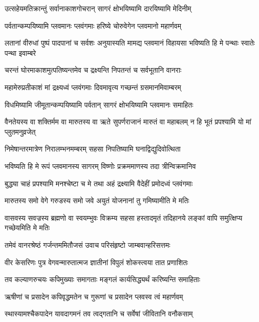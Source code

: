 \twolineshloka
{उत्सहेयमतिक्रान्तुं सर्वानाकाशगोचरान्}
{सागरं क्षोभयिष्यामि दारयिष्यामि मेदिनीम्} %

\twolineshloka
{पर्वतान्कम्पयिष्यामि प्लवमानः प्लवंगमाः}
{हरिष्ये चोरुवेगेन प्लवमानो महार्णवम्} %

\threelineshloka
{लतानां वीरुधां पुष्पं पादपानां च सर्वशः}
{अनुयास्यति मामद्य प्लवमानं विहायसा}
{भविष्यति हि मे पन्थाः स्वातेः पन्था इवाम्बरे} %

\twolineshloka
{चरन्तं घोरमाकाशमुत्पतिष्यन्तमेव च}
{द्रक्ष्यन्ति निपतन्तं च सर्वभूतानि वानराः} %

\twolineshloka
{महामेरुप्रतीकाशं मां द्रक्ष्यध्वं प्लवंगमाः}
{दिवमावृत्य गच्छन्तं ग्रसमानमिवाम्बरम्} %

\twolineshloka
{विधमिष्यामि जीमूतान्कम्पयिष्यामि पर्वतान्}
{सागरं क्षोभयिष्यामि प्लवमानः समाहितः} %

\threelineshloka
{वैनतेयस्य वा शक्तिर्मम वा मारुतस्य वा}
{ऋते सुपर्णराजानं मारुतं वा महाबलम्}
{न हि भूतं प्रपश्यामि यो मां प्लुतमनुव्रजेत्} %

\twolineshloka
{निमेषान्तरमात्रेण निरालम्भनमम्बरम्}
{सहसा निपतिष्यामि घनाद्विद्युदिवोत्थिता} %

\twolineshloka
{भविष्यति हि मे रूपं प्लवमानस्य सागरम्}
{विष्णोः प्रक्रममाणस्य तदा त्रीन्विक्रमानिव} %

\twolineshloka
{बुद्ध्या चाहं प्रपश्यामि मनश्चेष्टा च मे तथा}
{अहं द्रक्ष्यामि वैदेहीं प्रमोदध्वं प्लवंगमाः} %

\twolineshloka
{मारुतस्य समो वेगे गरुडस्य समो जवे}
{अयुतं योजनानां तु गमिष्यामीति मे मतिः} %

\threelineshloka
{वासवस्य सवज्रस्य ब्रह्मणो वा स्वयम्भुवः}
{विक्रम्य सहसा हस्तादमृतं तदिहानये}
{लङ्कां वापि समुत्क्षिप्य गच्छेयमिति मे मतिः} %

\twolineshloka
{तमेवं वानरश्रेष्ठं गर्जन्तममितौजसं}
{उवाच परिसंहृष्टो जाम्बवान्हरिसत्तमः} %

\twolineshloka
{वीर केसरिणः पुत्र वेगवन्मारुतात्मज}
{ज्ञातीनां विपुलं शोकस्त्वया तात प्रणाशितः} %

\twolineshloka
{तव कल्याणरुचयः कपिमुख्याः समागताः}
{मङ्गलं कार्यसिद्ध्यर्थं करिष्यन्ति समाहिताः} %

\twolineshloka
{ऋषीणां च प्रसादेन कपिवृद्धमतेन च}
{गुरूणां च प्रसादेन प्लवस्व त्वं महार्णवम्} %

\twolineshloka
{स्थास्यामश्चैकपादेन यावदागमनं तव}
{त्वद्गतानि च सर्वेषां जीवितानि वनौकसाम्} %

